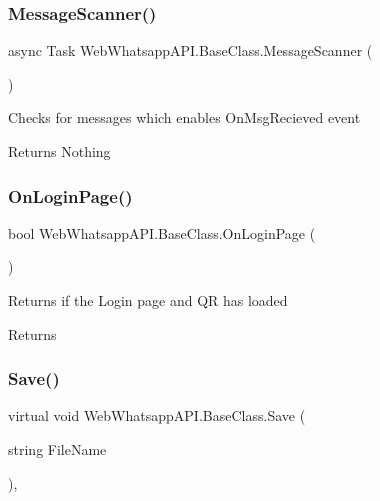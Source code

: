 \subsubsection{\texorpdfstring{Message\+Scanner()}{MessageScanner()}}
{\footnotesize\ttfamily async Task Web\+Whatsapp\+A\+P\+I.\+Base\+Class.\+Message\+Scanner (\begin{DoxyParamCaption}{ }\end{DoxyParamCaption})\hspace{0.3cm}{\ttfamily [inline]}}



Checks for messages which enables On\+Msg\+Recieved event 

\begin{DoxyReturn}{Returns}
Nothing
\end{DoxyReturn}
\mbox{\label{class_web_whatsapp_a_p_i_1_1_base_class_ace95215a9d65215e30c8fe3582800878}} 
\subsubsection{\texorpdfstring{On\+Login\+Page()}{OnLoginPage()}}
{\footnotesize\ttfamily bool Web\+Whatsapp\+A\+P\+I.\+Base\+Class.\+On\+Login\+Page (\begin{DoxyParamCaption}{ }\end{DoxyParamCaption})\hspace{0.3cm}{\ttfamily [inline]}}



Returns if the Login page and QR has loaded 

\begin{DoxyReturn}{Returns}

\end{DoxyReturn}
\mbox{\label{class_web_whatsapp_a_p_i_1_1_base_class_a03ddf85cb437ebabb7f3444d856bd8a7}} 
\subsubsection{\texorpdfstring{Save()}{Save()}}
{\footnotesize\ttfamily virtual void Web\+Whatsapp\+A\+P\+I.\+Base\+Class.\+Save (\begin{DoxyParamCaption}\item[{string}]{File\+Name }\end{DoxyParamCaption})\hspace{0.3cm}{\ttfamily [inline]}, {\ttfamily [virtual]}}



